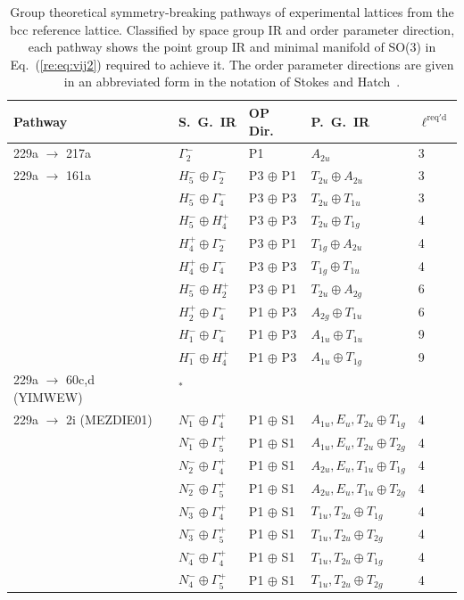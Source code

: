 \documentclass[preprint]{revtex4}
\begin{document}
\begin{table}[!ht]
\caption{Group theoretical symmetry-breaking pathways of experimental lattices from the
bcc reference lattice. Classified by space group IR and order
parameter direction, each pathway shows the point group IR and
minimal manifold of SO(3) in Eq.~(\ref{re:eq:vij2}) required to
achieve it.  The order parameter directions are given in an abbreviated form in the
notation of Stokes and
Hatch~\cite{Stokes02a}.}\label{pathwaysBCC} \tiny
\begin{tabular}{lllll}\hline
Pathway & S.~G.~IR & OP Dir. & P.~G.~IR & $\ell^{\mathrm{req'd}}$  \\
\hline
229a $\rightarrow$ 217a & $\Gamma_2^-$ & P1 & $A_{2u}$ & 3 \\

229a $\rightarrow$ 161a & $H_5^- \oplus \Gamma_2^-$ & P3 $\oplus$ P1 & $T_{2u} \oplus
A_{2u}$ & 3 \\
& $H_5^- \oplus \Gamma_4^-$ & P3 $\oplus$ P3 & $T_{2u} \oplus
T_{1u}$ &3 \\
& $H_5^- \oplus H_4^+$ & P3 $\oplus$ P3 & $T_{2u} \oplus T_{1g}$
& 4 \\
& $H_4^+ \oplus \Gamma_2^-$ & P3 $\oplus$ P1 & $T_{1g} \oplus A_{2u}$ & 4 \\
& $H_4^+ \oplus \Gamma_4^-$ & P3 $\oplus$ P3 & $T_{1g} \oplus T_{1u}$ & 4\\
& $H_5^- \oplus H_2^+$ & P3 $\oplus$ P1 & $T_{2u} \oplus A_{2g}$
& 6\\
& $H_2^+ \oplus \Gamma_4^-$ & P1 $\oplus$ P3 & $A_{2g} \oplus T_{1u}$ & 6 \\
& $H_1^- \oplus \Gamma_4^-$ & P1 $\oplus$ P3 & $A_{1u} \oplus
T_{1u}$ & 9 \\
& $H_1^- \oplus H_4^+$ & P1 $\oplus$ P3 & $A_{1u} \oplus T_{1g}$
& 9\\

229a $\rightarrow$ 60c,d (YIMWEW) & $^*$\\

229a $\rightarrow$ 2i (MEZDIE01) & $N_1^-\oplus\Gamma_4^+$ &
P1 $\oplus$ S1 & $A_{1u},E_u,T_{2u} \oplus T_{1g}$ & 4\\
& $N_1^-\oplus\Gamma_5^+$ & P1 $\oplus$ S1 & $A_{1u},E_u,T_{2u}
\oplus T_{2g}$ & 4\\
& $N_2^-\oplus\Gamma_4^+$ & P1 $\oplus$ S1 & $A_{2u},E_u,T_{1u}
\oplus T_{1g}$ & 4 \\
& $N_2^-\oplus\Gamma_5^+$ & P1 $\oplus$ S1 & $A_{2u},E_u,T_{1u}
\oplus T_{2g}$ & 4 \\
& $N_3^-\oplus\Gamma_4^+$ & P1 $\oplus$ S1 & $T_{1u},T_{2u} \oplus
T_{1g}$ & 4\\
& $N_3^-\oplus\Gamma_5^+$ & P1 $\oplus$ S1 & $T_{1u},T_{2u} \oplus
T_{2g}$ & 4\\
& $N_4^-\oplus\Gamma_4^+$ & P1 $\oplus$ S1 & $T_{1u},T_{2u} \oplus
T_{1g}$ & 4\\
& $N_4^-\oplus\Gamma_5^+$ & P1 $\oplus$ S1 & $T_{1u},T_{2u} \oplus
T_{2g}$ & 4\\


\end{tabular}
\end{table}
\end{document}
